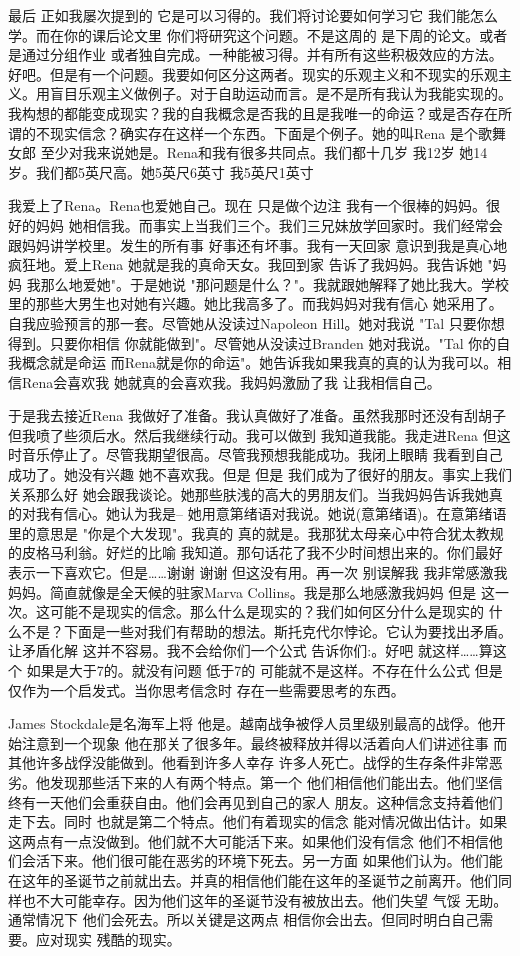 最后 正如我屡次提到的 它是可以习得的。我们将讨论要如何学习它 我们能怎么学。而在你的课后论文里 你们将研究这个问题。不是这周的 是下周的论文。或者是通过分组作业 或者独自完成。一种能被习得。并有所有这些积极效应的方法。好吧。但是有一个问题。我要如何区分这两者。现实的乐观主义和不现实的乐观主义。用盲目乐观主义做例子。对于自助运动而言。是不是所有我认为我能实现的。我构想的都能变成现实？我的自我概念是否我的且是我唯一的命运？或是否存在所谓的不现实信念？确实存在这样一个东西。下面是个例子。她的叫Rena 是个歌舞女郎 至少对我来说她是。Rena和我有很多共同点。我们都十几岁 我12岁 她14岁。我们都5英尺高。她5英尺6英寸 我5英尺1英寸 

我爱上了Rena。Rena也爱她自己。现在 只是做个边注 我有一个很棒的妈妈。很好的妈妈 她相信我。而事实上当我们三个。我们三兄妹放学回家时。我们经常会跟妈妈讲学校里。发生的所有事 好事还有坏事。我有一天回家 意识到我是真心地 疯狂地。爱上Rena 她就是我的真命天女。我回到家 告诉了我妈妈。我告诉她 "妈妈 我那么地爱她"。于是她说 "那问题是什么？"。我就跟她解释了她比我大。学校里的那些大男生也对她有兴趣。她比我高多了。而我妈妈对我有信心 她采用了。自我应验预言的那一套。尽管她从没读过Napoleon Hill。她对我说 "Tal 只要你想得到。只要你相信 你就能做到"。尽管她从没读过Branden 她对我说。"Tal 你的自我概念就是命运 而Rena就是你的命运"。她告诉我如果我真的真的认为我可以。相信Rena会喜欢我 她就真的会喜欢我。我妈妈激励了我 让我相信自己。 

于是我去接近Rena 我做好了准备。我认真做好了准备。虽然我那时还没有刮胡子 但我喷了些须后水。然后我继续行动。我可以做到 我知道我能。我走进Rena 但这时音乐停止了。尽管我期望很高。尽管我预想我能成功。我闭上眼睛 我看到自己成功了。她没有兴趣 她不喜欢我。但是 但是 我们成为了很好的朋友。事实上我们关系那么好 她会跟我谈论。她那些肤浅的高大的男朋友们。当我妈妈告诉我她真的对我有信心。她认为我是-- 她用意第绪语对我说。她说(意第绪语)。在意第绪语里的意思是 "你是个大发现"。我真的 真的就是。我那犹太母亲心中符合犹太教规的皮格马利翁。好烂的比喻 我知道。那句话花了我不少时间想出来的。你们最好表示一下喜欢它。但是……谢谢 谢谢 但这没有用。再一次 别误解我 我非常感激我妈妈。简直就像是全天候的驻家Marva Collins。我是那么地感激我妈妈 但是 这一次。这可能不是现实的信念。那么什么是现实的？我们如何区分什么是现实的 什么不是？下面是一些对我们有帮助的想法。斯托克代尔悖论。它认为要找出矛盾。让矛盾化解 这并不容易。我不会给你们一个公式 告诉你们:。好吧 就这样……算这个 如果是大于7的。就没有问题 低于7的 可能就不是这样。不存在什么公式 但是 仅作为一个启发式。当你思考信念时 存在一些需要思考的东西。 

James Stockdale是名海军上将 他是。越南战争被俘人员里级别最高的战俘。他开始注意到一个现象 他在那关了很多年。最终被释放并得以活着向人们讲述往事 而其他许多战俘没能做到。他看到许多人幸存 许多人死亡。战俘的生存条件非常恶劣。他发现那些活下来的人有两个特点。第一个 他们相信他们能出去。他们坚信终有一天他们会重获自由。他们会再见到自己的家人 朋友。这种信念支持着他们走下去。同时 也就是第二个特点。他们有着现实的信念 能对情况做出估计。如果这两点有一点没做到。他们就不大可能活下来。如果他们没有信念 他们不相信他们会活下来。他们很可能在恶劣的环境下死去。另一方面 如果他们认为。他们能在这年的圣诞节之前就出去。并真的相信他们能在这年的圣诞节之前离开。他们同样也不大可能幸存。因为他们这年的圣诞节没有被放出去。他们失望 气馁 无助。通常情况下 他们会死去。所以关键是这两点 相信你会出去。但同时明白自己需要。应对现实 残酷的现实。 

